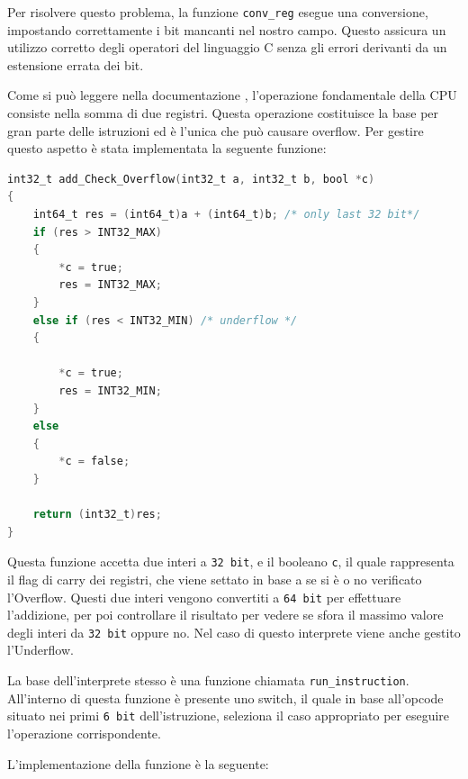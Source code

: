Per risolvere questo problema, la funzione \texttt{conv\_reg} esegue una conversione, impostando correttamente i bit mancanti nel nostro campo. Questo assicura un utilizzo corretto degli operatori del linguaggio C senza gli errori derivanti da un estensione errata dei bit.

\vspace{0.3cm}

\noindent Come si può leggere nella documentazione \cite{sitoMicroblaze}, l'operazione fondamentale della CPU consiste nella somma di due registri. Questa operazione costituisce la base per gran parte delle istruzioni ed è l'unica che può causare overflow. Per gestire questo aspetto è stata implementata la seguente funzione:
\begin{lstlisting}[language=C]
int32_t add_Check_Overflow(int32_t a, int32_t b, bool *c)
{
    int64_t res = (int64_t)a + (int64_t)b; /* only last 32 bit*/
    if (res > INT32_MAX)
    {
        *c = true;
        res = INT32_MAX;
    }
    else if (res < INT32_MIN) /* underflow */
    {

        *c = true;
        res = INT32_MIN;
    }
    else
    {
        *c = false;
    }

    return (int32_t)res;
}
\end{lstlisting}
Questa funzione accetta due interi a \texttt{32 bit}, e il booleano \texttt{c}, il quale rappresenta il flag di carry dei registri, che viene settato in base a se si è o no verificato l'Overflow. 
Questi due interi vengono convertiti a \texttt{64 bit} per effettuare l'addizione, per poi controllare il risultato per vedere se sfora il massimo valore degli interi da \texttt{32 bit} oppure no.
Nel caso di questo interprete viene anche gestito l'Underflow.

La base dell'interprete stesso è una funzione chiamata \texttt{run\_instruction}. All'interno di questa funzione è presente uno switch, il quale in base all'opcode situato nei primi \texttt{6 bit} dell'istruzione, seleziona il caso appropriato per eseguire l'operazione corrispondente. 

\vspace{0.3cm}
\noindent L'implementazione della funzione è la seguente:

